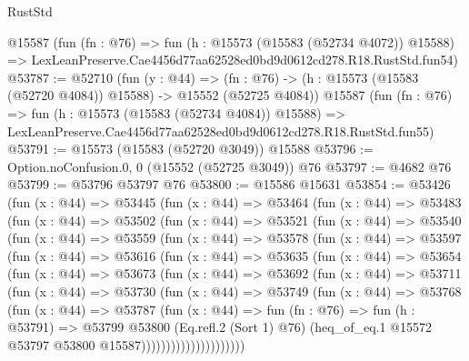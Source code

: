 \begin{lexlean}{RustStd}
\begin{coremodule}
    @15587
    (fun (fn : @76) =>
    fun (h : @15573 (@15583 (@52734 @4072)) @15588) =>
    LexLeanPreserve.Cae4456d77aa62528ed0bd9d0612cd278.R18.RustStd.fun54)
@53787 := @52710
    (fun (y : @44) =>
    (fn : @76) -> (h : @15573 (@15583 (@52720 @4084)) @15588) -> @15552 (@52725 @4084))
    @15587
    (fun (fn : @76) =>
    fun (h : @15573 (@15583 (@52734 @4084)) @15588) =>
    LexLeanPreserve.Cae4456d77aa62528ed0bd9d0612cd278.R18.RustStd.fun55)
@53791 := @15573 (@15583 (@52720 @3049)) @15588
@53796 := Option.noConfusion.{0, 0} (@15552 (@52725 @3049)) @76
@53797 := @4682 @76
@53799 := @53796 @53797 @76
@53800 := @15586 @15631
@53854 := @53426
    (fun (x : @44) =>
    @53445
      (fun (x : @44) =>
      @53464
        (fun (x : @44) =>
        @53483
          (fun (x : @44) =>
          @53502
            (fun (x : @44) =>
            @53521
              (fun (x : @44) =>
              @53540
                (fun (x : @44) =>
                @53559
                  (fun (x : @44) =>
                  @53578
                    (fun (x : @44) =>
                    @53597
                      (fun (x : @44) =>
                      @53616
                        (fun (x : @44) =>
                        @53635
                          (fun (x : @44) =>
                          @53654
                            (fun (x : @44) =>
                            @53673
                              (fun (x : @44) =>
                              @53692
                                (fun (x : @44) =>
                                @53711
                                  (fun (x : @44) =>
                                  @53730
                                    (fun (x : @44) =>
                                    @53749
                                      (fun (x : @44) =>
                                      @53768
                                        (fun (x : @44) =>
                                        @53787
                                          (fun (x : @44) =>
                                          fun (fn : @76) =>
                                          fun (h : @53791) =>
                                          @53799
                                            @53800
                                            (Eq.refl.{2} (Sort 1) @76)
                                            (heq_of_eq.{1}
                                              @15572
                                              @53797
                                              @53800
                                              @15587)))))))))))))))))))))

\end{coremodule}
\end{lexlean}

